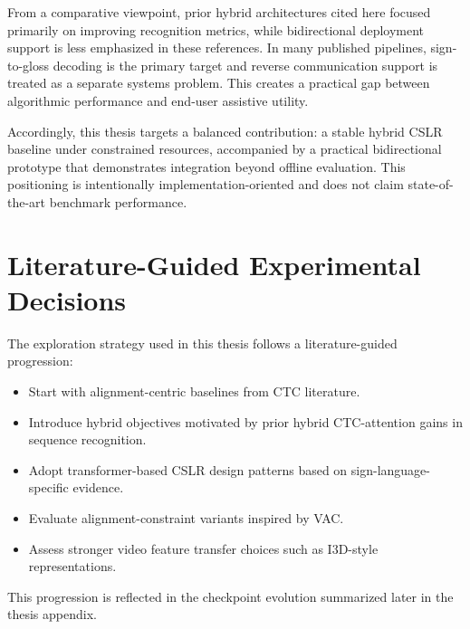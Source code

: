 From a comparative viewpoint, prior hybrid architectures cited here focused primarily on improving recognition metrics, while bidirectional deployment support is less emphasized in these references. In many published pipelines, sign-to-gloss decoding is the primary target and reverse communication support is treated as a separate systems problem. This creates a practical gap between algorithmic performance and end-user assistive utility.

Accordingly, this thesis targets a balanced contribution: a stable hybrid CSLR baseline under constrained resources, accompanied by a practical bidirectional prototype that demonstrates integration beyond offline evaluation. This positioning is intentionally implementation-oriented and does not claim state-of-the-art benchmark performance.

\section{Literature-Guided Experimental Decisions}

The exploration strategy used in this thesis follows a literature-guided progression:
\begin{itemize}
    \item Start with alignment-centric baselines from CTC literature.\cite{graves2006connectionist}
    \item Introduce hybrid objectives motivated by prior hybrid CTC-attention gains in sequence recognition.\cite{watanabe2017hybrid}
    \item Adopt transformer-based CSLR design patterns based on sign-language-specific evidence.\cite{camgoz2020sign}
    \item Evaluate alignment-constraint variants inspired by VAC.\cite{zhu2021visual}
    \item Assess stronger video feature transfer choices such as I3D-style representations.\cite{carreira2017quo}
\end{itemize}

This progression is reflected in the checkpoint evolution summarized later in the thesis appendix.
